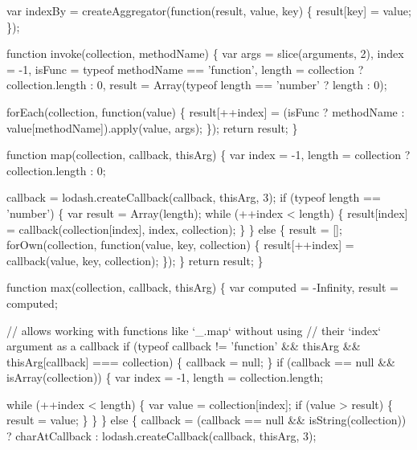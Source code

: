 \begin{DoxyCodeInclude}
    var indexBy = createAggregator(\textcolor{keyword}{function}(result, value, key) \{
      result[key] = value;
    \});

    \textcolor{keyword}{function} invoke(collection, methodName) \{
      var args = slice(arguments, 2),
          index = -1,
          isFunc = typeof methodName == \textcolor{stringliteral}{'function'},
          length = collection ? collection.length : 0,
          result = Array(typeof length == \textcolor{stringliteral}{'number'} ? length : 0);

      forEach(collection, \textcolor{keyword}{function}(value) \{
        result[++index] = (isFunc ? methodName : value[methodName]).apply(value, args);
      \});
      \textcolor{keywordflow}{return} result;
    \}

    \textcolor{keyword}{function} map(collection, callback, thisArg) \{
      var index = -1,
          length = collection ? collection.length : 0;

      callback = lodash.createCallback(callback, thisArg, 3);
      \textcolor{keywordflow}{if} (typeof length == \textcolor{stringliteral}{'number'}) \{
        var result = Array(length);
        \textcolor{keywordflow}{while} (++index < length) \{
          result[index] = callback(collection[index], index, collection);
        \}
      \} \textcolor{keywordflow}{else} \{
        result = [];
        forOwn(collection, \textcolor{keyword}{function}(value, key, collection) \{
          result[++index] = callback(value, key, collection);
        \});
      \}
      \textcolor{keywordflow}{return} result;
    \}

    \textcolor{keyword}{function} max(collection, callback, thisArg) \{
      var computed = -Infinity,
          result = computed;

      \textcolor{comment}{// allows working with functions like `\_.map` without using}
      \textcolor{comment}{// their `index` argument as a callback}
      \textcolor{keywordflow}{if} (typeof callback != \textcolor{stringliteral}{'function'} && thisArg && thisArg[callback] === collection) \{
        callback = null;
      \}
      \textcolor{keywordflow}{if} (callback == null && isArray(collection)) \{
        var index = -1,
            length = collection.length;

        \textcolor{keywordflow}{while} (++index < length) \{
          var value = collection[index];
          \textcolor{keywordflow}{if} (value > result) \{
            result = value;
          \}
        \}
      \} \textcolor{keywordflow}{else} \{
        callback = (callback == null && isString(collection))
          ? charAtCallback
          : lodash.createCallback(callback, thisArg, 3);


\end{DoxyCodeInclude}
